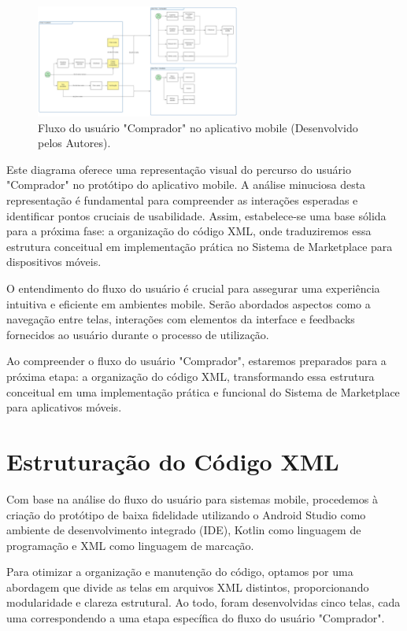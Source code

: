 \documentclass[
	12pt,				%
	openright,			%
	twoside,			%
	a4paper,			%
	english,			%
	brazil				%
	]{abntex2}
\begin{document}
\begin{figure}[htb]
    \centering
    \includegraphics[width=0.6\textwidth]{img/User-Flow}
    \caption{Fluxo do usuário "Comprador" no aplicativo mobile (Desenvolvido pelos Autores).}
    \label{fig:diagrama-user-flow-mobile}
\end{figure}

Este diagrama oferece uma representação visual do percurso do usuário "Comprador" no protótipo do aplicativo mobile. A análise minuciosa desta representação é fundamental para compreender as interações esperadas e identificar pontos cruciais de usabilidade. Assim, estabelece-se uma base sólida para a próxima fase: a organização do código XML, onde traduziremos essa estrutura conceitual em implementação prática no Sistema de Marketplace para dispositivos móveis.

O entendimento do fluxo do usuário é crucial para assegurar uma experiência intuitiva e eficiente em ambientes mobile. Serão abordados aspectos como a navegação entre telas, interações com elementos da interface e feedbacks fornecidos ao usuário durante o processo de utilização.

Ao compreender o fluxo do usuário "Comprador", estaremos preparados para a próxima etapa: a organização do código XML, transformando essa estrutura conceitual em uma implementação prática e funcional do Sistema de Marketplace para aplicativos móveis.

\section{Estruturação do Código XML}

Com base na análise do fluxo do usuário para sistemas mobile, procedemos à criação do protótipo de baixa fidelidade utilizando o Android Studio como ambiente de desenvolvimento integrado (IDE), Kotlin como linguagem de programação e XML como linguagem de marcação.

Para otimizar a organização e manutenção do código, optamos por uma abordagem que divide as telas em arquivos XML distintos, proporcionando modularidade e clareza estrutural. Ao todo, foram desenvolvidas cinco telas, cada uma correspondendo a uma etapa específica do fluxo do usuário "Comprador".
\end{document}
